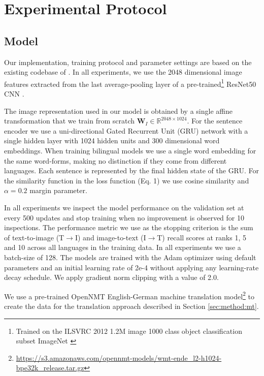 \section{Experimental Protocol}

\subsection{Model}

Our implementation, training protocol and parameter settings are based on the existing codebase of \cite{kadar2018conll}.
In all experiments, we use the 2048 dimensional image features extracted from the
last average-pooling layer of a pre-trained\footnote{Trained on the ILSVRC 2012 1.2M image 1000 class object classification
subset ImageNet \citep{russakovsky2015imagenet}} 
ResNet50 CNN \citep{he2016deep}. 
  
The image representation used in our model is obtained by a single 
affine transformation that we train from scratch 
$\mathbf{W}_{I} \in \mathbb{R}^{2048 \times 1024}$. For the sentence
encoder we use a uni-directional Gated Recurrent Unit (GRU) 
network \citep{cho2014properties} with a single hidden layer with 
1024  hidden units and 300 dimensional word embeddings. 
When training bilingual models we use a single word embedding
for the same word-forms, making no distinction if they come 
from different languages. Each sentence is represented by the final 
hidden state of the GRU. For the similarity function in the loss function (Eq. 1) we use cosine similarity and $\alpha=0.2$ margin parameter.

In all experiments we inspect the model performance on the validation 
set at every 500 updates
and stop training when no improvement is observed for 10 inspections. 
The performance metric we use as the stopping criterion is the 
sum of text-to-image (T$\rightarrow$I) and 
image-to-text (I$\rightarrow$T) recall scores at ranks 
1, 5 and 10 across all languages in the training data. 
In all experiments we use a batch-size of 128.
The models are trained with the Adam optimizer \citep{kingma2014adam} 
using default parameters and an initial learning rate of
\mbox{2e-4}
without applying any learning-rate decay schedule.
We apply gradient norm clipping with a value of 2.0.

We use a pre-trained
OpenNMT \citep{2017opennmt} English-German machine translation model\footnote{\footnotesize{\url{https://s3.amazonaws.com/opennmt-models/wmt-ende_l2-h1024-bpe32k_release.tar.gz}}} to create the data for the translation approach described in Section \ref{sec:method:mt}.


